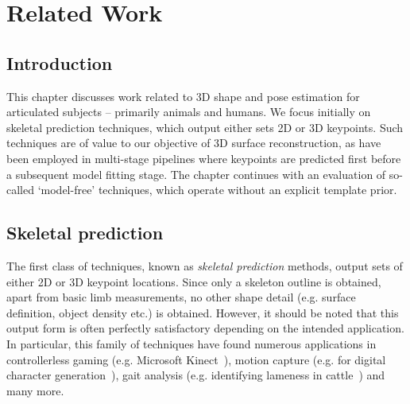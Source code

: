 
\chapter{Related Work}

\ifpdf
    \graphicspath{{Chapter3/Figs/Raster/}{Chapter3/Figs/PDF/}{Chapter3/Figs/}}
\else
    \graphicspath{{Chapter3/Figs/Vector/}{Chapter3/Figs/}}
\fi

\section{Introduction}

This chapter discusses work related to 3D shape and pose estimation for articulated subjects -- primarily animals and humans. We focus initially on skeletal prediction techniques, which output either sets 2D or 3D keypoints. Such techniques are of value to our objective of 3D surface reconstruction, as have been employed in multi-stage pipelines where keypoints are predicted first before a subsequent model fitting stage. The chapter continues with an evaluation of so-called `model-free' techniques, which operate without an explicit template prior.


% 


\section{Skeletal prediction}

The first class of techniques, known as \textit{skeletal prediction} methods, output sets of either 2D or 3D keypoint locations. Since only a skeleton outline is obtained, apart from basic limb measurements, no other shape detail (e.g. surface definition, object density etc.) is obtained. However, it should be noted that this output form is often perfectly satisfactory depending on the intended application. In particular, this family of techniques have found numerous applications in controllerless gaming (e.g. Microsoft Kinect~\cite{kinectpaper}), motion capture (e.g. for digital character generation~\cite{xxx}), gait analysis (e.g. identifying lameness in cattle~\cite{xxx}) and many more. 


